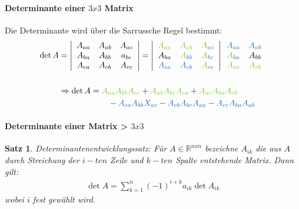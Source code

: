 \documentclass[12pt,a4paper]{report}%
\newtheorem{satz}{Satz}[section]
\numberwithin{equation}{section}
\newcommand{\R}{\mathbb{R}} %
\newcommand{\subsubsubsection}{\paragraph}
\def\colGreen#1{\begingroup\color{LimeGreen}{#1}\endgroup}
\def\colBlue#1{\begingroup\color{NavyBlue}{#1}\endgroup}
\numberwithin{equation}{subsection}
\begin{document}
	  \subsubsubsection{Determinante einer $3x3$ Matrix}
	  Die Determinante wird über die Sarrussche Regel bestimmt:
  \begin{align}
    \det A &= \left|
      \begin{array}{c c c}
      A_{aa} & A_{ab} & A_{ac}\\
      A_{ba} & A_{bb} & a_{bc}\\
      A_{ca} & A_{cb} & A_{cc}\\
      \end{array}
    \right|    
    = \left|
      \begin{array}{c c c}
      \colGreen{A_{aa}} & \colGreen{A_{ab}} & \colGreen{A}_{\colBlue{ac}}\\
      A_{ba} & \colGreen{A}_{\colBlue{bb}} & \colGreen{A}_{\colBlue{bc}}\\
      \colBlue{A_{ca}} & \colBlue{A_{cb}} & \colGreen{A}_{\colBlue{cc}}\\
      \end{array}
    \right| 
    \begin{array}{c c}
      \colBlue{A_{aa}} & \colBlue{A_{ab}}\\
      \colGreen{A}_{\colBlue{ba}} & A_{bb}\\
      \colGreen{A_{ca}} & \colGreen{A_{cb}}\\
    \end{array} \nonumber \\
    \nonumber \\
    &\Rightarrow \det A =   \colGreen{A_{aa}} \colGreen{A_{bb}} \colGreen{A_{cc}} 
      + \colGreen{A_{ab}}   \colGreen{A_{bc}} \colGreen{A_{ca}}
      + \colGreen{A_{ac}}   \colGreen{A_{ba}} \colGreen{A_{cb}} \nonumber \\
      &\qquad \qquad \qquad- \colBlue{A_{ca}}    \colBlue{A_{bb}}  \colBlue{X_{ac}} 
      - \colBlue{A_{cb}}    \colBlue{A_{bc}}  \colBlue{A_{aa}}
      - \colBlue{A_{cc}}    \colBlue{A_{ba}}  \colBlue{A_{ab}}
  \end{align}
  
  \subsubsubsection{Determinante einer Matrix > $3x3$}
  \begin{satz}
    Determinantenentwicklungssatz: Für $A \in \R^{nxn}$ bezeichne $A_{ik}$ die aus $A$ durch Streichung der $i-ten$ Zeile und $k-ten$ Spalte entstehende Matrix. Dann gilt:
    \begin{align*}
      \det A = \sum_{k=1}^{n} (-1)^{i+k} a_{ik}\det A_{ik}
    \end{align*}
    wobei $i$ fest gewählt wird.
  \end{satz}
  
\end{document}
